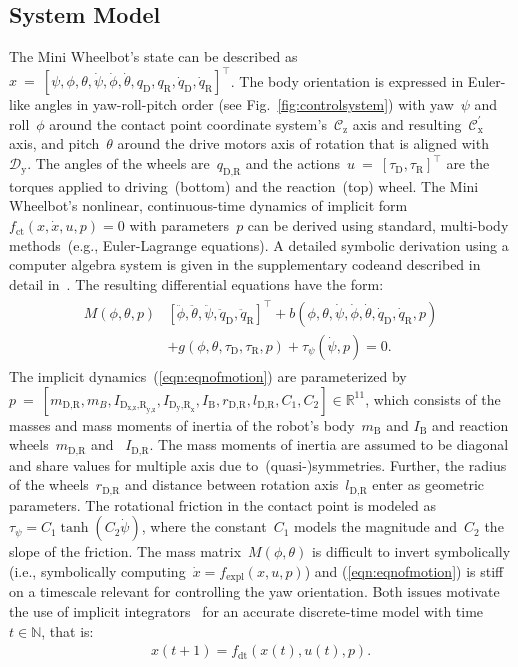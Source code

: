\subsection{System Model}
\label{sec:systemmodel}
The Mini Wheelbot's state can be described as~$x~=~[\psi,\phi,\theta,\dot{\psi},\dot{\phi},\dot{\theta},q_\text{D}, q_\text{R}, \dot{q}_\text{D}, \dot{q}_\text{R}]^\top$.
The body orientation is expressed in Euler-like angles in yaw-roll-pitch order (see Fig.~\ref{fig:controlsystem}) with yaw~$\psi$ and roll~$\phi$ around the contact point coordinate system's~$\mathcal{C}_\text{z}$ axis and resulting~$\mathcal{C}^\prime_\text{x}$ axis, and pitch~$\theta$ around the drive motors axis of rotation that is aligned with~$\mathcal{D}_\text{y}$.
The angles of the wheels are~$q_\text{D,R}$ and the actions~$u~=~[\tau_\text{D}, \tau_\text{R}]^\top$ are the torques applied to driving~(bottom) and the reaction~(top) wheel.
The Mini Wheelbot's nonlinear, continuous-time dynamics of implicit form~$f_\text{ct}(x,\dot{x}, u, p)=0$ with parameters~$p$ can be derived using standard, multi-body methods~(e.g.,  Euler-Lagrange equations).
A detailed symbolic derivation using a computer algebra system is given in the supplementary code\footnotemark[1] and described in detail in~\cite{daud2017dynamic}.
The resulting differential equations have the form:
\begin{align}\label{eqn:eqnofmotion}
    \begin{split}M(\phi,\theta,p)&[\ddot{\phi},\ddot{\theta},\ddot{\psi}, \ddot{q}_\text{D}, \ddot{q}_\text{R}]^\top + b(\phi, \theta, \dot{\psi}, \dot{\phi}, \dot{\theta}, \dot{q}_\text{D}, \dot{q}_\text{R},p) \\ &+ g(\phi, \theta, \tau_\text{D}, \tau_\text{R},p)+\tau_{\psi}(\dot{\psi},p)= 0.
    \end{split}
\end{align}
The implicit dynamics~(\ref{eqn:eqnofmotion}) are parameterized by $p~=~[m_\text{D,R}, m_{B}, I_{\text{D}_\text{x,z}\text{,R}_\text{y,z}}, I_{\text{D}_\text{y}\text{,R}_\text{x}},
I_\text{B},
r_\text{D,R},
l_\text{D,R},
C_1, C_2]\in\mathbb{R}^{11}$, which consists of the masses and mass moments of inertia of the robot's body~$m_\text{B}$ and $I_\text{B}$ and reaction wheels~$m_\text{D,R}$ and ~$I_\text{D,R}$.
The mass moments of inertia are assumed to be diagonal and share values for multiple axis due to~(quasi-)symmetries.
Further, the radius of the wheels~$r_\text{D,R}$ and distance between rotation axis~$l_\text{D,R}$ enter as geometric parameters.
The rotational friction in the contact point is modeled as~$\tau_{\psi}=C_1\tanh(C_2\dot{\psi})$, where the constant~$C_1$ models the magnitude and~$C_2$ the slope of the friction.
The mass matrix~$M(\phi,\theta)$ is difficult to invert symbolically (i.e., symbolically computing~$\dot{x}=f_\text{expl}(x,u,p)$) and (\ref{eqn:eqnofmotion}) is stiff on a timescale relevant for controlling the yaw orientation.
Both issues motivate the use of implicit integrators~\cite{frey2023fast} for an accurate discrete-time model with time~$t\in\mathbb{N}$, that is:
\begin{align} \label{eqn:systemdynamics}
        x(t+1) = f_\text{dt}(x(t), u(t), p).
\end{align}



